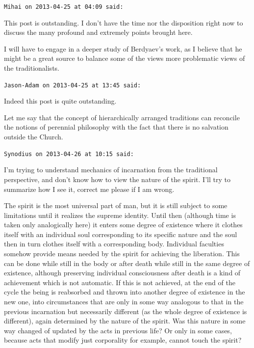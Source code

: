 \begin{footnotesize}
\begin{sffamily}
\texttt{Mihai on 2013-04-25 at 04:09 said:}

This post is outstanding. I don't have the time nor the disposition right now to discuss the many profound and extremely points brought here.

I will have to engage in a deeper study of Berdyaev's work, as I believe that he might be a great source to balance some of the views more problematic views of the traditionalists.

\hfill

\texttt{Jason-Adam on 2013-04-25 at 13:45 said:}

Indeed this post is quite outstanding.

Let me say that the concept of hierarchically arranged traditions can reconcile the notions of perennial philosophy with the fact that there is no salvation outside the Church.

\hfill

\texttt{Synodius on 2013-04-26 at 10:15 said:}

I'm trying to understand mechanics of incarnation from the traditional perspective, and don't know how to view the nature of the spirit. I'll try to summarize how I see it, correct me please if I am wrong.

The spirit is the most universal part of man, but it is still subject to some limitations until it realizes the supreme identity. Until then (although time is taken only analogically here) it enters some degree of existence where it clothes itself with an individual soul corresponding to its specific nature and the soul then in turn clothes itself with a corresponding body. Individual faculties somehow provide means needed by the spirit for achieving the liberation. This can be done while still in the body or after death while still in the same degree of existence, although preserving individual consciousness after death is a kind of achievement which is not automatic. If this is not achieved, at the end of the cycle the being is reabsorbed and thrown into another degree of existence in the new one, into circumstances that are only in some way analogous to that in the previous incarnation but necessarily different (as the whole degree of existence is different), again determined by the nature of the spirit. Was this nature in some way changed of updated by the acts in previous life? Or only in some cases, because acts that modify just corporality for example, cannot touch the spirit?


\end{sffamily}
\end{footnotesize}

